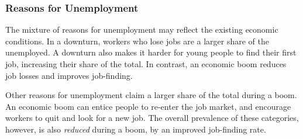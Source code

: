 \subsubsection*{Reasons for Unemployment}
\begin{minipage}{0.76\textwidth}  
\vspace{-0.5mm}
\small 

The mixture of reasons for unemployment may reflect the existing economic conditions. In a downturn, workers who lose jobs are a larger share of the unemployed. A downturn also makes it harder for young people to find their first job, increasing their share of the total. In contrast, an economic boom reduces job losses and improves job-finding. 

Other reasons for unemployment claim a larger share of the total during a boom. An economic boom can entice people to re-enter the job market, and encourage workers to quit and look for a new job. The overall prevalence of these categories, however, is also \textit{reduced} during a boom, by an improved job-finding rate. 
\vspace{1mm}

\vspace{3.6cm}


\end{minipage}
